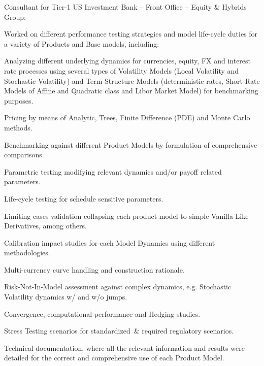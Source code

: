 \begin{cventries}
{\begin{cvitems}
{        }
        \item{Consultant for Tier-1 US Investment Bank – Front Office – Equity \& Hybrids Group:
          \vspace{+6.0mm}
          \begin{cvitems}
            \item {Worked on different performance testing strategies and model life-cycle
            duties for a variety of Products and Base models, including:
              \vspace{+6.0mm}
              \begin{cvitems}
                \item Analyzing different underlying dynamics for currencies, equity, FX and
                interest rate processes using several types of Volatility Models (Local
                Volatility and Stochastic Volatility) and Term Structure Models
                (deterministic rates, Short Rate Models of Affine and Quadratic class and
                Libor Market Model) for benchmarking purposes.
                \item Pricing by means of Analytic, Trees, Finite Difference (PDE) and Monte
                Carlo methods.
                \item Benchmarking against different Product Models by formulation of
                comprehensive comparisons.
                \item Parametric testing modifying relevant dynamics and/or payoff related
                parameters.
                \item Life-cycle testing for schedule sensitive parameters.
                \item Limiting cases validation collapsing each product model to simple
                Vanilla-Like Derivatives, among others.
                \item Calibration impact studies for each Model Dynamics using different
                methodologies.
                \item Multi-currency curve handling and construction rationale.
                \item Risk-Not-In-Model assessment against complex dynamics, e.g. Stochastic
                Volatility dynamics w/ and w/o jumps.
                \item Convergence, computational performance and Hedging studies.
                \item Stress Testing scenarios for standardized \& required regulatory
                scenarios.
                \item Technical documentation, where all the relevant information and
                results were detailed for the correct and comprehensive use of each Product
                Model.
              \end{cvitems}
              \vspace{+4.0mm}
          }
          \end{cvitems}
          \vspace{+4.0mm}
        }
      \end{cvitems}
      \vspace{1em}
    }


\end{cventries}
